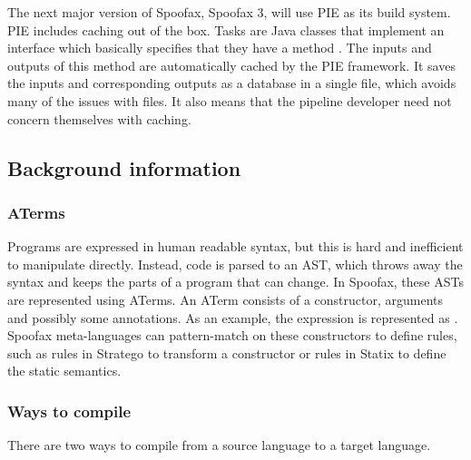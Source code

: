 The next major version of Spoofax, Spoofax 3, will use \ac{PIE} as its build system.
\Ac{PIE} includes caching out of the box.
Tasks are Java classes that implement an interface which basically specifies that they have a method .
The inputs and outputs of this method are automatically cached by the \ac{PIE} framework.
It saves the inputs and corresponding outputs as a database in a single file, which avoids many of the issues with files.
It also means that the pipeline developer need not concern themselves with caching.

\subsection{Background information}
\label{subsec:problem_analysis__background}

\subsubsection{ATerms}
\label{subsubsec:problem_analysis__background__aterms}

Programs are expressed in human readable syntax, but this is hard and inefficient to manipulate directly.
Instead, code is parsed to an \ac{AST}, which throws away the syntax and keeps the parts of a program that can change.
In Spoofax, these \acp{AST} are represented using ATerms.
An ATerm consists of a constructor, arguments and possibly some annotations.
As an example, the expression  is represented as .
Spoofax meta-languages can pattern-match on these constructors to define rules, such as rules in Stratego to transform a constructor or rules in Statix to define the static semantics.

\subsubsection{Ways to compile}
\label{subsubsec:problem_analysis__background__ways_to_compile}

There are two ways to compile from a source language to a target language.

